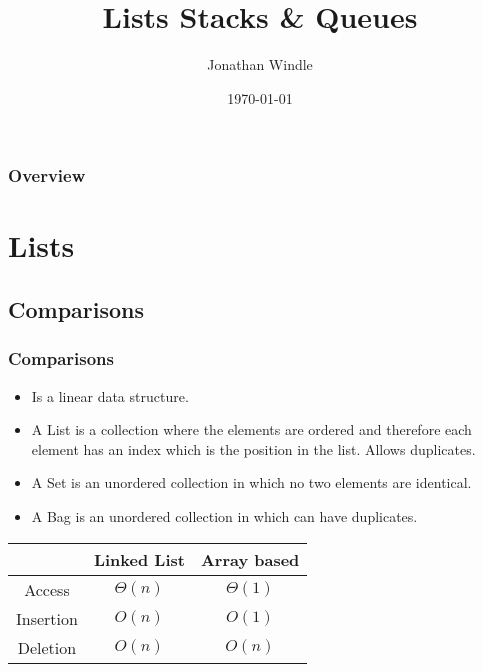 \documentclass{beamer}
\title[Lists Stacks \& Queues]{Lists Stacks \& Queues} %
\author{Jonathan Windle} %
\institute[UEA] %
{
University of East Anglia \\ %
\medskip
\textit{J.Windle@uea.ac.uk} %
}
\date{\today} %
\begin{document}
\begin{frame}
\titlepage %
\end{frame}

\begin{frame}[allowframebreaks]
\frametitle{Overview} %
\tableofcontents %
\end{frame}

\section{Lists}
\subsection{Comparisons}
\begin{frame}
\frametitle{Comparisons}
\begin{itemize}
\item Is a {\color{purple} linear data structure}.
\item A List is a collection where the elements are {\color{red} ordered} and therefore each element has an index which is the position in the list. Allows duplicates.
\item A Set is  an {\color{green} unordered} collection in which no two elements are identical.
\item A Bag is an {\color{green} unordered} collection in which can have duplicates.
\end{itemize}
\begin{tabular}{|c|c|c|}
\hline
 & Linked List & Array based \\
\hline
 Access & $\Theta(n)$ & $\Theta(1)$ \\
 \hline
 Insertion & $O(n)$ & $O(1)$\\
 \hline
 Deletion & $O(n)$ & $O(n)$\\
 \hline
\end{tabular}
\end{frame}
\end{document}
